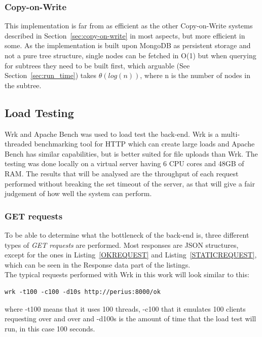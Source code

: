 \documentclass[a4paper,12pt]{article}
\begin{document}
\subsubsection{Copy-on-Write}
This implementation is far from as efficient as the other Copy-on-Write systems described in
Section~\ref{sec:copy-on-write} in most aspects, but more efficient in some. As the implementation
is built upon MongoDB as persistent storage and not a pure tree structure, single nodes can be
fetched in O(1) but when querying for subtrees they need to be built first, which arguable (See
Section~\ref{sec:run_time}) takes $\theta(log(n))$, where n is the number of nodes in the subtree. 

\newpage
\subsection{Load Testing} \label{sec:load_testing}
Wrk and Apache Bench was used to load test the back-end. Wrk is a multi-threaded benchmarking tool
for HTTP which can create large loads and Apache Bench has similar capabilities, but is better
suited for file uploads than Wrk. The testing was done locally on a virtual server having 6 CPU
cores and 48GB of RAM. The results that will be analysed are the throughput of each request
performed without breaking the set timeout of the server, as that will give a fair judgement of how
well the system can perform.

\subsubsection{GET requests} \label{sec:GET_REQUESTS}
To be able to determine what the bottleneck of the back-end is, three different types of \textit{GET
requests} are performed. Most responses are JSON structures, except for the ones in
Listing~\ref{OKREQUEST} and Listing~\ref{STATICREQUEST}, which can be seen in the Response data part
of the listings.\\

The typical requests performed with Wrk in this work will look similar to this:
\begin{lstlisting}[frame=single]
wrk -t100 -c100 -d10s http://perius:8000/ok
\end{lstlisting}
where -t100 means that it uses 100 threads, -c100 that it emulates 100 clients requesting over and
over and -d100s is the amount of time that the load test will run, in this case 100 seconds.
\end{document}
